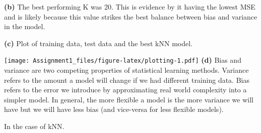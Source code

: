 \documentclass[
]{article}
\newenvironment{Shaded}{\begin{snugshade}}{\end{snugshade}}
\newcommand{\AttributeTok}[1]{\textcolor[rgb]{0.77,0.63,0.00}{#1}}
\newcommand{\DecValTok}[1]{\textcolor[rgb]{0.00,0.00,0.81}{#1}}
\newcommand{\FunctionTok}[1]{\textcolor[rgb]{0.00,0.00,0.00}{#1}}
\newcommand{\NormalTok}[1]{#1}
\newcommand{\SpecialCharTok}[1]{\textcolor[rgb]{0.00,0.00,0.00}{#1}}
\newcommand{\StringTok}[1]{\textcolor[rgb]{0.31,0.60,0.02}{#1}}
\begin{document}
\textbf{(b)} The best performing K was 20. This is evidence by it having
the lowest MSE and is likely because this value strikes the best balance
between bias and variance in the model.

\textbf{(c)} Plot of training data, test data and the best kNN model.

\begin{Shaded}
\end{Shaded}

\texttt{[image: Assignment1\_files/figure-latex/plotting-1.pdf]}
\textbf{(d)} Bias and variance are two competing properties of
statistical learning methods. Variance refers to the amount a model will
change if we had different training data. Bias refers to the error we
introduce by approximating real world complexity into a simpler model.
In general, the more flexible a model is the more variance we will have
but we will have less bias (and vice-versa for less flexible models).

In the case of kNN.
\end{document}
